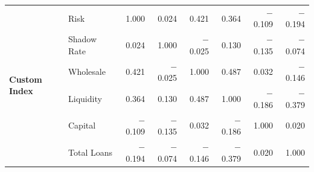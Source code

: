 \documentclass[12pt,a4paper]{report}
\begin{document}
\begin{table}[H]
{\begin{tabular}{ll rrrrrr}
\multirow{6}{*}{\textbf{Custom Index}}
 & Risk          &  1.000 &  0.024 &  0.421 &  0.364 & $-$0.109 & $-$0.194 \\
 & Shadow Rate   &  0.024 &  1.000 & $-$0.025 &  0.130 & $-$0.135 & $-$0.074 \\
 & Wholesale     &  0.421 & $-$0.025 &  1.000 &  0.487 &  0.032 & $-$0.146 \\
 & Liquidity     &  0.364 &  0.130 &  0.487 &  1.000 & $-$0.186 & $-$0.379 \\
 & Capital       & $-$0.109 & $-$0.135 &  0.032 & $-$0.186 &  1.000 &  0.020 \\
 & Total Loans   & $-$0.194 & $-$0.074 & $-$0.146 & $-$0.379 &  0.020 &  1.000 \\

\bottomrule
\end{tabular}%
}
\end{table}
\end{document}
